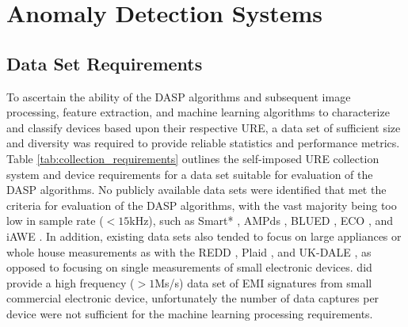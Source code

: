 
\chapter{Anomaly Detection Systems}
\label{Anomaly Detection Systems Chapter}

\section[Data Requirements]{Data Set Requirements}

To ascertain the ability of the DASP algorithms and subsequent image processing, feature extraction, and machine learning algorithms to characterize and classify devices based upon their respective URE, a data set of sufficient size and diversity was required to provide reliable statistics and performance metrics.  Table \ref{tab:collection_requirements} outlines the self-imposed URE collection system and device requirements for a data set suitable for evaluation of the DASP algorithms.  No publicly available data sets were identified that met the criteria for evaluation of the DASP algorithms, with the vast majority being too low in sample rate ($< 15$kHz), such as Smart* \cite{Barker2012}, AMPds \cite{Makonin2013}, BLUED \cite{Filip2011}, ECO \cite{Beckel2014}, and iAWE \cite{Batra2014}.  In addition, existing data sets also tended to focus on large appliances or whole house measurements as with the REDD \cite{Kolter2011},  Plaid \cite{Gao2014}, and UK-DALE \cite{Kelly2015}, as opposed to focusing on single measurements of small electronic devices.  \cite{Gulati2014} did provide a high frequency ($>1$Ms/s) data set of EMI signatures from small commercial electronic device, unfortunately the number of data captures per device were not sufficient for the machine learning processing requirements. 

